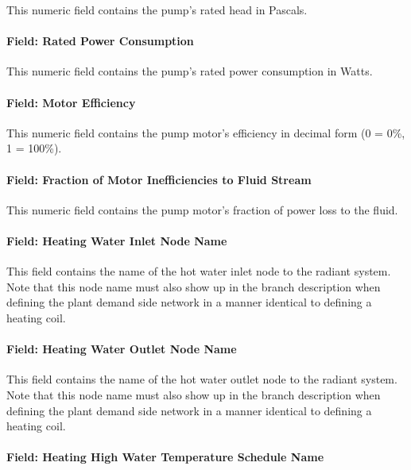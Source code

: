 This numeric field contains the pump's rated head in Pascals.

\paragraph{Field: Rated Power Consumption}\label{field-rated-power-consumption-000}

This numeric field contains the pump's rated power consumption in Watts.

\paragraph{Field: Motor Efficiency}\label{field-motor-efficiency-001}

This numeric field contains the pump motor's efficiency in decimal form (0 = 0\%, 1 = 100\%).

\paragraph{Field: Fraction of Motor Inefficiencies to Fluid Stream}\label{field-fraction-of-motor-inefficiencies-to-fluid-stream-000}

This numeric field contains the pump motor's fraction of power loss to the fluid.

\paragraph{Field: Heating Water Inlet Node Name}\label{field-heating-water-inlet-node-name-1}

This field contains the name of the hot water inlet node to the radiant system. Note that this node name must also show up in the branch description when defining the plant demand side network in a manner identical to defining a heating coil.

\paragraph{Field: Heating Water Outlet Node Name}\label{field-heating-water-outlet-node-name-1}

This field contains the name of the hot water outlet node to the radiant system. Note that this node name must also show up in the branch description when defining the plant demand side network in a manner identical to defining a heating coil.

\paragraph{Field: Heating High Water Temperature Schedule Name}\label{field-heating-high-water-temperature-schedule-name}

